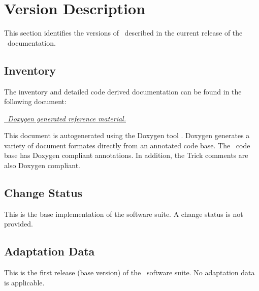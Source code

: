 %
%
%
\chapter{Version Description}\label{sec:versions}
This section identifies the versions of
\TrickHLA\ described in the current release of the \TrickHLA\ documentation.
 
\section{Inventory}
The inventory and detailed code derived documentation can be found in the
following document:
 
\href{file:refman.pdf}
           {\em \TrickHLA\ Doxygen generated reference material.}

This document is autogenerated using the Doxygen tool \cite{Doxygen}.
Doxygen generates a variety of document formates directly from an annotated
code base.  The \TrickHLA\ code base has Doxygen compliant annotations.  In
addition, the Trick comments are also Doxygen compliant.

\section{Change Status}
This is the base implementation of the software suite.  A change
status is not provided.
 
\section{Adaptation Data}
This is the first release (base version) of the \TrickHLA\ software suite.
No adaptation data is applicable.
 
